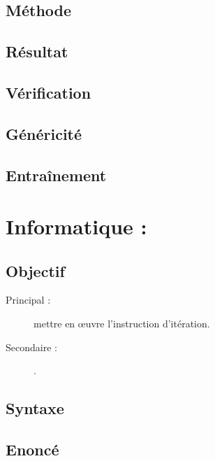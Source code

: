 \subsection{Méthode}\label{boucles:physique:methode}

\subsection{Résultat}\label{boucles:physique:resultat}

\subsection{Vérification}\label{boucles:physique:verification}

\subsection{Généricité}\label{boucles:physique:genericite}

\subsection{Entraînement}\label{boucles:physique:entrainement}

\section{Informatique : }\label{boucles:informatique}

\subsection{Objectif}\label{boucles:informatique:objectif}
\begin{description}
\item[Principal : ] mettre en \oe uvre l'instruction d'itération.
\item[Secondaire :] .
\end{description}

\subsection{Syntaxe \python}\label{boucles:informatique:python}

\subsection{Enoncé}\label{boucles:informatique:enonce}

